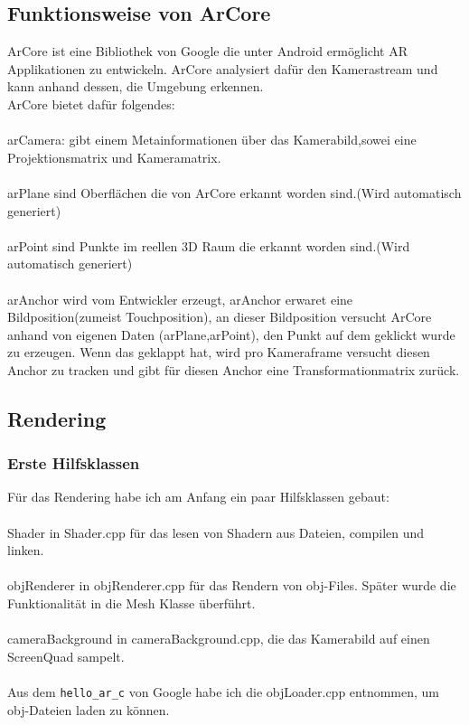 \subsection{Funktionsweise von ArCore}
ArCore\cite{ar_core} ist eine Bibliothek von Google die unter Android ermöglicht AR Applikationen zu entwickeln.
ArCore analysiert dafür den Kamerastream und kann anhand dessen, die Umgebung erkennen.\\
ArCore bietet dafür folgendes:
\\ \\
arCamera: gibt einem Metainformationen über das Kamerabild,sowei eine Projektionsmatrix und Kameramatrix.
\\ \\
arPlane sind Oberflächen die von ArCore erkannt worden sind.(Wird automatisch generiert)
\\ \\
arPoint sind Punkte im reellen 3D Raum die erkannt worden sind.(Wird automatisch generiert)
\\ \\
arAnchor wird vom Entwickler erzeugt, arAnchor erwaret eine Bildposition(zumeist Touchposition), an dieser Bildposition versucht ArCore anhand von eigenen Daten (arPlane,arPoint), den Punkt auf dem geklickt wurde zu erzeugen. Wenn das geklappt hat, wird pro Kameraframe versucht diesen Anchor zu tracken und gibt für diesen Anchor eine Transformationmatrix zurück.


\subsection{Rendering}
\subsubsection{Erste Hilfsklassen}
Für das Rendering habe ich am Anfang ein paar Hilfsklassen gebaut:\\ \\
Shader in Shader.cpp für das lesen von Shadern aus Dateien, compilen und linken.\\ \\
objRenderer in objRenderer.cpp für das Rendern von obj-Files. Später wurde die
Funktionalität in die Mesh Klasse überführt.\\ \\
cameraBackground in cameraBackground.cpp, die das Kamerabild auf einen ScreenQuad sampelt.\\ \\
Aus dem \verb|hello_ar_c| von Google habe ich die objLoader.cpp entnommen, um obj-Dateien
laden zu können.
